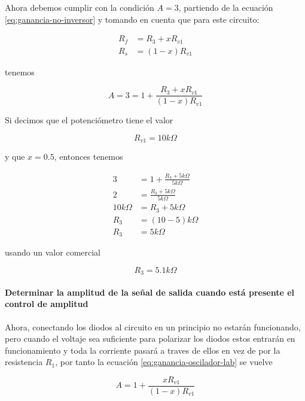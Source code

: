 Ahora debemos cumplir con la condición $A = 3$, partiendo de la ecuación \ref{eq:ganancia-no-inversor} y tomando en cuenta que para este circuito:

\begin{align}
    R_f &= R_3 + xR_{v1} \\
    R_s &= (1-x) R_{v1}
\end{align}

tenemos

\begin{equation}
    A = 3 = 1 + \frac{R_3 + xR_{v1}}{(1-x)R_{v1}}
    \label{eq:ganancia-oscilador-lab}
\end{equation}

Si decimos que el potenciómetro tiene el valor

\begin{equation}
    \boxed{R_{v1} =  10k\Omega}
\end{equation}

y que $x = 0.5$, entonces tenemos

\begin{align*}
    3 &= 1 + \frac{R_3 + 5k\Omega}{5k\Omega} \\
    2 &= \frac{R_3 + 5k\Omega}{5k\Omega} \\
    10k\Omega &= R_3 + 5k\Omega \\
    R_3 &= (10 - 5)k \Omega \\
    R_3 &= 5 k\Omega
\end{align*}

usando un valor comercial

\begin{equation}
    \boxed{R_3 = 5.1 k\Omega}
\end{equation}

\paragraph{Determinar la amplitud de la señal de salida cuando está presente el control de amplitud\\}

Ahora, conectando los diodos al circuito en un principio no estarán funcionando, pero cuando el voltaje sea suficiente para polarizar los diodos estos entrarán en funcionamiento y toda la corriente pasará a traves de ellos en vez de por la resistencia $R_1$, por tanto la ecuación \ref{eq:ganancia-oscilador-lab} se vuelve

\begin{equation}
    A = 1 + \frac{x R_{v1}}{(1-x)R_{v1}}
\end{equation}


